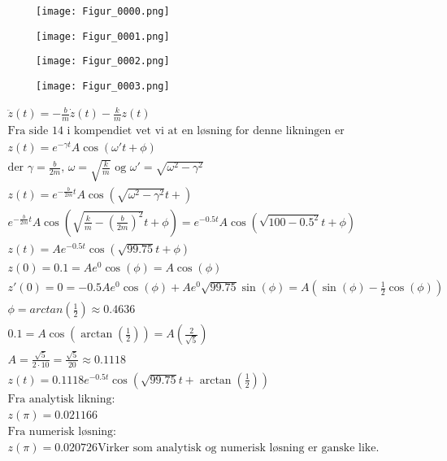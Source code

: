 \documentclass[11pt, A4paper,norsk]{article}
\begin{document}
				\begin{figure}[H]
\texttt{[image: Figur\_0000.png]}
				\end{figure}
				\begin{figure}[H]
\texttt{[image: Figur\_0001.png]}
				\end{figure}
				\begin{figure}[H]
\texttt{[image: Figur\_0002.png]}
				\end{figure}
				\begin{figure}[H]
\texttt{[image: Figur\_0003.png]}
				\end{figure}

				\begin{gather*}
\ddot{z}(t) = - \frac{b}{m} \dot{z}(t) - \frac{k}{m} z(t) \\
\text{Fra side 14 i kompendiet vet vi at en løsning for denne likningen er} \\
z(t) = e^{- \gamma t} A \cos ( \omega' t + \phi ) \\
\text{der $\gamma = \frac{b}{2m}$, $\omega = \sqrt{\frac{k}{m}}$ og $\omega' = \sqrt{\omega^2 - \gamma^2}$} \\
z(t) = e^{- \frac{b}{2m} t} A \cos \left( \sqrt{\omega^2 - \gamma^2} t +  \right) \\
e^{- \frac{b}{2m} t} A \cos \left( \sqrt{\frac{k}{m} - \left( \frac{b}{2m} \right)^2} t +  \phi \right) = e^{- 0.5 t} A \cos \left( \sqrt{100 - 0.5^2} t + \phi \right) \\
z(t) = A e^{-0.5t} \cos(\sqrt{99.75} t + \phi) \\
z(0) = 0.1 = A e^{0} \cos(\phi) = A \cos(\phi) \\
z'(0) = 0 = - 0.5 A e^{0} \cos(\phi) + A e^{0} \sqrt{99.75} \sin(\phi) = A(\sin(\phi) - \frac{1}{2}\cos(\phi)) \\
\phi = arctan\left( \frac{1}{2} \right) \approx 0.4636 \\
0.1 = A \cos \left( \arctan \left(\frac{1}{2} \right) \right) = A \left( \frac{2}{\sqrt{5}} \right) \\
A = \frac{\sqrt{5}}{2 \cdot 10} = \frac{\sqrt{5}}{20} \approx 0.1118 \\
z(t) = 0.1118 e^{-0.5t} \cos \left( \sqrt{99.75} t + \arctan\left( \frac{1}{2} \right) \right) \\
\text{Fra analytisk likning:} \\
z(\pi) = 0.021166 \\
\text{Fra numerisk løsning:} \\
z(\pi) = 0.020726
\text{Virker som analytisk og numerisk løsning er ganske like.}
				\end{gather*}
\end{document}
